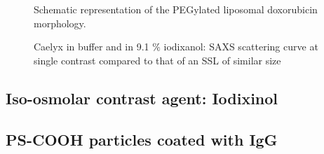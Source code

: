 \begin{figure}
	\centering
		\caption{ Schematic representation of the PEGylated liposomal doxorubicin morphology.}
\end{figure}

\begin{figure}
	\centering
		
		\caption{Caelyx in buffer and in 9.1 $\%$ iodixanol: SAXS scattering curve at single contrast compared to that of an SSL of similar size}
		\label{fig:CaelyxIodixanolSingleContrast}
\end{figure}

\subsection{Iso-osmolar contrast agent: Iodixinol}

\subsection{PS-COOH particles coated with IgG}

